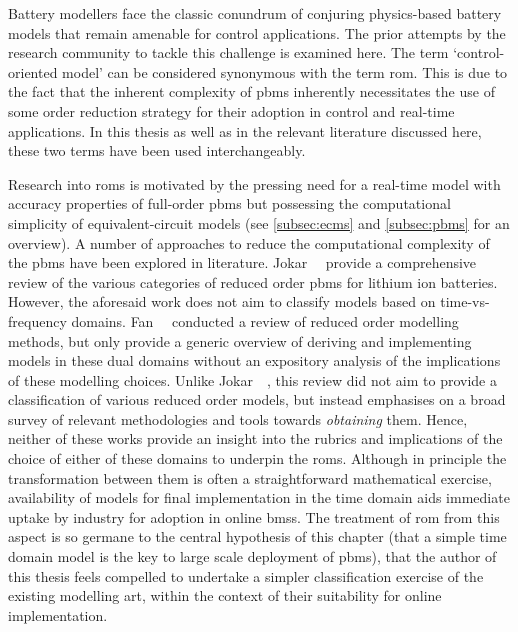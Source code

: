 

Battery modellers face the classic  conundrum of conjuring physics-based battery
models that remain amenable for control  applications. The prior attempts by the
research  community  to  tackle  this  challenge  is  examined  here.  The  term
`control-oriented model' can  be considered synonymous with  the term \gls{rom}.
This is due  to the fact that the inherent  complexity of \glspl{pbm} inherently
necessitates the  use of  some order  reduction strategy  for their  adoption in
control and  real-time applications. In this  thesis as well as  in the relevant
literature discussed here, these two terms have been used interchangeably.

Research into  \glspl{rom} is  motivated by  the pressing  need for  a real-time
model  with accuracy  properties of  full-order \glspl{pbm}  but possessing  the
computational  simplicity of  equivalent-circuit models  (see \cref{subsec:ecms}
and \cref{subsec:pbms}  for an overview). A  number of approaches to  reduce the
computational complexity  of the \glspl{pbm}  have been explored  in literature.
Jokar~\etal~\cite{Jokar2016}  provide  a  comprehensive review  of  the  various
categories of reduced order \glspl{pbm}  for lithium ion batteries. However, the
aforesaid  work does  not  aim  to classify  models  based on  time-vs-frequency
domains.  Fan~\etal{}~\cite{Fan2015}   conducted  a  review  of   reduced  order
modelling  methods,  but  only  provide  a  generic  overview  of  deriving  and
implementing models in these dual domains  without an expository analysis of the
implications  of these  modelling choices.  Unlike Jokar~\etal~\cite{Jokar2016},
this review  did not aim  to provide a  classification of various  reduced order
models, but instead  emphasises on a broad survey of  relevant methodologies and
tools  towards \emph{obtaining}  them.  Hence, neither  of  these works  provide
an  insight  into  the  rubrics  and   implications  of  the  choice  of  either
of  these  domains  to  underpin  the \glspl{rom}.  Although  in  principle  the
transformation between  them is  often a straightforward  mathematical exercise,
availability  of models for final  implementation in the  time domain  aids
immediate  uptake by  industry  for  adoption in  online \glspl{bms}. The
treatment of \gls{rom} from  this aspect is so  germane to the central
hypothesis of  this chapter (that a simple time domain model is the key
to large scale deployment of \glspl{pbm}),
that  the author  of  this thesis  feels compelled  to undertake  a simpler
classification  exercise of  the  existing  modelling art,  within  the context
of their suitability for online implementation.


